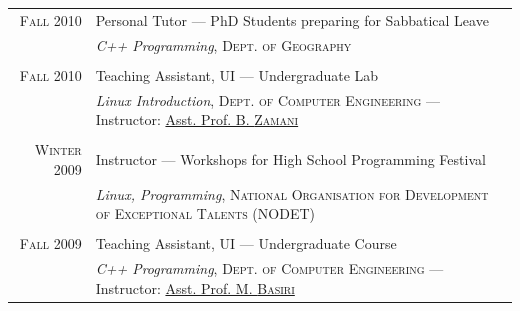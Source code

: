 \begin{tabular}{r|p{}}
  \textsc{Fall} 2010 &
  Personal Tutor — PhD Students preparing for Sabbatical Leave \\
  & \emph{C++ Programming}, \small\textsc{Dept. of Geography}\normalsize
  \\  \vspace{-3mm} \\

  \textsc{Fall} 2010 &
  Teaching Assistant, \textsc{UI} — Undergraduate Lab \\
  & \emph{Linux Introduction}, \small\textsc{Dept. of Computer Engineering} —
    Instructor: \href{https://scholar.google.co.uk/citations?user=RujHbk8AAAAJ}{Asst. Prof. B. \textsc{Zamani}}\normalsize
  \\  \vspace{-3mm} \\

  \textsc{Winter} 2009 &
  Instructor — Workshops for High School Programming Festival \\
  & \emph{Linux, Programming}, \small\textsc{National Organisation for Development of Exceptional Talents (NODET)}\normalsize
  \\  \vspace{-3mm} \\

  \textsc{Fall} 2009 &
  Teaching Assistant, \textsc{UI} — Undergraduate Course \\
  & \emph{C++ Programming}, \small\textsc{Dept. of Computer Engineering} —
    Instructor: \href{https://scholar.google.com/citations?user=D77IvVUAAAAJ&hl=en}{Asst. Prof. M. \textsc{Basiri}}\normalsize

\end{tabular}

